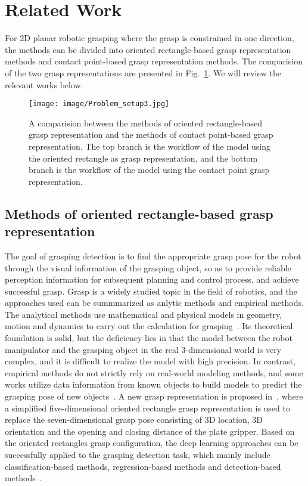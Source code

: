 \documentclass[journal]{IEEEtran}
\begin{document}
\section{Related Work}
For 2D planar robotic grasping where the grasp is constrained in one direction, the methods can be divided into oriented rectangle-based grasp representation methods and contact point-based grasp representation methods. The comparision of the two grasp representations are presented in Fig.~\ref{fig:representation}. We will review the relevant works below.

\begin{figure}[t!] 
	\centering 
	\texttt{[image: image/Problem\_setup3.jpg]}
	\caption{A comparision between the methods of oriented rectangle-based grasp representation and the methods of contact point-based grasp representation. The top branch is the workflow of the model using the oriented rectangle as grasp representation, and the bottom branch is the workflow of the model using the contact point grasp representation.}
	\label{fig:representation}
\end{figure}

\subsection{Methods of oriented rectangle-based grasp representation}
The goal of grasping detection is to find the appropriate grasp pose for the robot through the visual information of the grasping object, so as to provide reliable perception information for subsequent planning and control process, and achieve successful grasp. Grasp is a widely studied topic in the field of robotics, and the approaches used can be summmarized as anlytic methods and empirical methods. The analytical methods use mathematical and physical models in geometry, motion and dynamics to carry out the calculation for grasping~\cite{review}. Its theoretical foundation is solid, but the deficiency lies in that the model between the robot manipulator and the grasping object in the real 3-dimensional world is very complex, and it is difficult to realize the model with high precision. In contrast, empirical methods do not strictly rely on real-world modeling methods, and some works utilize data information from known objects to build models to predict the grasping pose of new objects~\cite{detecting,gqstn,roi}. A new grasp representation is proposed in~\cite{jiang}, where a simplified five-dimensional oriented rectangle grasp representation is used to replace the seven-dimensional grasp pose consisting of 3D location, 3D orientation and the opening and closing distance of the plate gripper. Based on the oriented rectangles grasp configuration, the deep learning approaches can be successfully applied to the grasping detection task, which mainly include classification-based methods, regression-based methods and detection-based methods~\cite{survey}.
\end{document}
